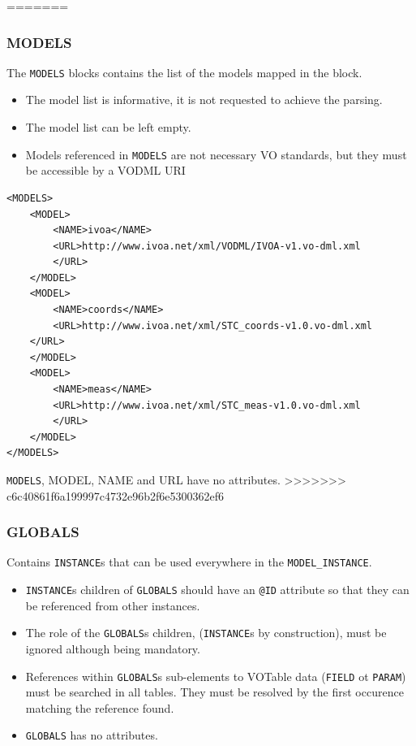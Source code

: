 \documentclass[11pt,a4paper]{ivoa}
\begin{document}
=======
\subsubsection{MODELS}

The  \texttt{MODELS}  blocks contains the list of the models mapped in the block. 


\begin{itemize}
    \item The model list is informative, it is not requested to achieve the parsing.
    \item The model list can be left empty.
    \item Models referenced in \texttt{MODELS} are not necessary VO standards, but they must be accessible by a VODML URI
\end{itemize}

\begin{lstlisting}[caption={GLOBALS block example},style=XML]
<MODELS>
    <MODEL>
        <NAME>ivoa</NAME>
        <URL>http://www.ivoa.net/xml/VODML/IVOA-v1.vo-dml.xml
        </URL>
    </MODEL>
    <MODEL>
        <NAME>coords</NAME>
        <URL>http://www.ivoa.net/xml/STC_coords-v1.0.vo-dml.xml
    </URL>
    </MODEL>
    <MODEL>
        <NAME>meas</NAME>
        <URL>http://www.ivoa.net/xml/STC_meas-v1.0.vo-dml.xml
        </URL>
    </MODEL>
</MODELS>
\end{lstlisting}

 \texttt{MODELS},  {MODEL},  {NAME} and {URL}  have no attributes. 
>>>>>>> c6c40861f6a199997c4732e96b2f6e5300362ef6
 \FloatBarrier

%
%

\subsubsection{GLOBALS}
 Contains  \texttt{INSTANCE}s  that can be used everywhere in the \texttt{MODEL\_INSTANCE}.

\begin{itemize}
    \item \texttt{INSTANCE}s children of \texttt{GLOBALS} should have an  \texttt{@ID} attribute so that they can be referenced from other instances.
    \item The role of the \texttt{GLOBALS}s children, (\texttt{INSTANCE}s by construction), must be ignored although being mandatory.
    \item References within \texttt{GLOBALS}s  sub-elements to VOTable data (\texttt{FIELD} ot \texttt{PARAM}) must be searched in all tables. 
            They must be resolved by the first occurence matching the reference found.
    \item \texttt{GLOBALS} has no attributes. 
\end{itemize}
\end{document}
